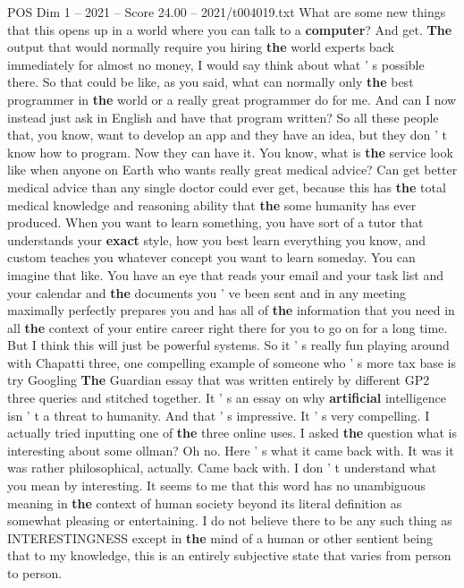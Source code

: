 \begin{textsample}{POS Dim 1 – 2021 – Score 24.00 – 2021/t004019.txt}
What are some new things that this opens up in a world where you can talk to a \textbf{computer}?
And get. \textbf{The} output that would normally require you hiring \textbf{the} world experts back immediately for almost no money, I would say think about what ' s possible there.
So that could be like, as you said, what can normally only \textbf{the} best programmer in \textbf{the} world or a really great programmer do for me.
And can I now instead just ask in English and have that program written?
So all these people that, you know, want to develop an app and they have an idea, but they don ' t know how to program.
Now they can have it.
You know, what is \textbf{the} service look like when anyone on Earth who wants really great medical advice?
Can get better medical advice than any single doctor could ever get, because this has \textbf{the} total medical knowledge and reasoning ability that \textbf{the} some humanity has ever produced.
When you want to learn something, you have sort of a tutor that understands your \textbf{exact} style, how you best learn everything you know, and custom teaches you whatever concept you want to learn someday.
You can imagine that like.
You have an eye that reads your email and your task list and your calendar and \textbf{the} documents you ' ve been sent and in any meeting maximally perfectly prepares you and has all of \textbf{the} information that you need in all \textbf{the} context of your entire career right there for you to go on for a long time.
But I think this will just be powerful systems.
So it ' s really fun playing around with Chapatti three, one compelling example of someone who ' s more tax base is try Googling \textbf{The} Guardian essay that was written entirely by different GP2 three queries and stitched together.
It ' s an essay on why \textbf{artificial} intelligence isn ' t a threat to humanity.
And that ' s impressive.
It ' s very compelling.
I actually tried inputting one of \textbf{the} three online uses.
I asked \textbf{the} question what is interesting about some ollman?
Oh no.
Here ' s what it came back with.
It was it was rather philosophical, actually.
Came back with.
I don ' t understand what you mean by interesting.
It seems to me that this word has no unambiguous meaning in \textbf{the} context of human society beyond its literal definition as somewhat pleasing or entertaining.
I do not believe there to be any such thing as INTERESTINGNESS except in \textbf{the} mind of a human or other sentient being that to my knowledge, this is an entirely subjective state that varies from person to person.

\end{textsample}
